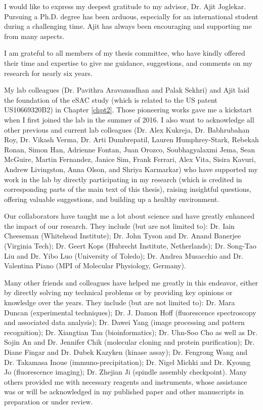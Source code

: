 I would like to express my deepest gratitude to my advisor, Dr. Ajit Joglekar. Pursuing a Ph.D. degree has been arduous, especially for an international student during a challenging time. Ajit has always been encouraging and supporting me from many aspects.

I am grateful to all members of my thesis committee, who have kindly offered their time and expertise to give me guidance, suggestions, and comments on my research for nearly six years.

My lab colleagues (Dr. Pavithra Aravamudhan and Palak Sekhri) and Ajit laid the foundation of the eSAC study (which is related to the US patent US10669320B2) in Chapter \ref{chpt2}. Those pioneering works gave me a kickstart when I first joined the lab in the summer of 2016. I also want to acknowledge all other previous and current lab colleagues (Dr. Alex Kukreja, Dr. Babhrubahan Roy, Dr. Vikash Verma, Dr. Arti Dumbrepatil, Lauren Humphrey-Stark, Rebekah Ronan, Simon Han,  Adrienne Fontan, Juan Orozco, Soubhagyalaxmi Jema, Sean McGuire, Martin Fernandez, Janice Sim, Frank Ferrari, Alex Vita, Sisira Kavuri, Andrew Livingston, Anna Olson, and Shriya Karmarkar) who have supported my work in the lab by directly participating in my research (which is credited in corresponding parts of the main text of this thesis), raising insightful questions, offering valuable suggestions, and building up a healthy environment.

Our collaborators have taught me a lot about science and have greatly enhanced the impact of our research. They include (but are not limited to): Dr. Iain Cheeseman (Whitehead Institute); Dr. John Tyson and Dr. Anand Banerjee (Virginia Tech); Dr. Geert Kops (Hubrecht Institute, Netherlands); Dr. Song-Tao Liu and Dr. Yibo Luo (University of Toledo); Dr. Andrea Musacchio and Dr. Valentina Piano (MPI of Molecular Physiology, Germany).

Many other friends and colleagues have helped me greatly in this endeavor, either by directly solving my technical problems or by providing key opinions or knowledge over the years. They include (but are not limited to): Dr. Mara Duncan (experimental techniques); Dr. J. Damon Hoff (fluorescence spectroscopy and associated data analysis); Dr. Dawei Yang (image processing and pattern recognition); Dr. Xiangtian Tan (bioinformatics); Dr. Uhn-Soo Cho as well as Dr. Sojin An and Dr. Jennifer Chik (molecular cloning and protein purification); Dr. Diane Fingar and Dr. Dubek Kazyken (kinase assay); Dr. Fengrong Wang and Dr. Takamasa Inoue (immuno-precipitation); Dr. Nigel Michki and Dr. Kyoung Jo (fluorescence imaging); Dr. Zhejian Ji (spindle assembly checkpoint). Many others provided me with necessary reagents and instruments, whose assistance was or will be acknowledged in my published paper \cite{eSAC} and other manuscripts in preparation or under review.

